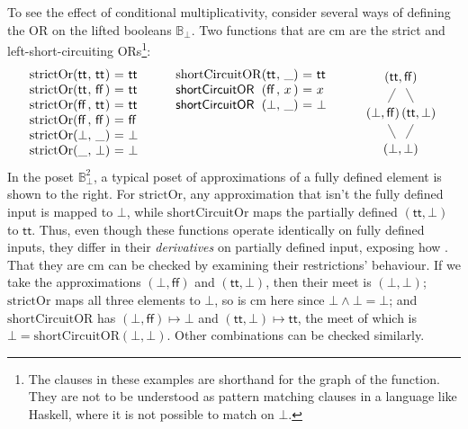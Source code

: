 \begin{example}
  \label{ex:strict-short-circuit}
  To see the effect of conditional multiplicativity, consider several
  ways of defining the OR on the lifted booleans
  $\mathbb{B}_\bot$. Two functions that are cm are the strict and
  left-short-circuiting ORs\footnote{The clauses in these examples are
    shorthand for the graph of the function. They are not to be
    understood as pattern matching clauses in a language like Haskell,
    where it is not possible to match on $\bot$.}:
  \begin{displaymath}
    \begin{array}[t]{l@{(}l@{,~}l@{)~}c@{~}l}
      \mathrm{strictOr}&\mathsf{tt}&\mathsf{tt}&=&\mathsf{tt} \\
      \mathrm{strictOr}&\mathsf{tt}&\mathsf{ff}&=&\mathsf{tt} \\
      \mathrm{strictOr}&\mathsf{ff}&\mathsf{tt}&=&\mathsf{tt} \\
      \mathrm{strictOr}&\mathsf{ff}&\mathsf{ff}&=&\mathsf{ff} \\
      \mathrm{strictOr}&\bot&\_&=&\bot \\
      \mathrm{strictOr}&\_&\bot&=&\bot \\
    \end{array}
    \qquad
    \begin{array}[t]{l@{(}l@{,~}l@{)~}c@{~}l}
      \mathrm{shortCircuitOR}&\mathsf{tt}&\_&=&\mathsf{tt} \\
      \mathsf{shortCircuitOR}&\mathsf{ff}&x&=&x \\
      \mathsf{shortCircuitOR}&\bot&\_& =& \bot
    \end{array}
    \qquad
    \raisebox{-15ex}{
      \begin{tikzpicture}
        \node (top) at (0,0) {$(\mathsf{tt},\mathsf{ff})$};
        \node [below of=top,xshift=-0.5cm] (oi) {$(\bot,\mathsf{ff})$};
        \node [below of=top,xshift=0.5cm] (io) {$(\mathsf{tt},\bot)$};
        \node [below of=oi,xshift=0.5cm] (oo) {$(\bot,\bot)$};
        \draw (top) -- (oi);
        \draw (top) -- (io);
        \draw (oi) -- (oo);
        \draw (io) -- (oo);
      \end{tikzpicture}
    }
  \end{displaymath}
  In the poset $\mathbb{B}_\bot^2$, a typical poset of approximations of a fully defined element is shown to the right. For $\mathrm{strictOr}$, any approximation that isn't the fully defined input is mapped to $\bot$, while $\mathrm{shortCircuitOr}$ maps the partially defined $(\mathsf{tt},\bot)$ to $\mathsf{tt}$. Thus, even though these functions operate identically on fully defined inputs, they differ in their \emph{derivatives} on partially defined input, exposing how . That they are cm can be checked by examining their restrictions' behaviour. If we take the approximations $(\bot,\mathsf{ff})$ and $(\mathsf{tt},\bot)$, then their meet is $(\bot,\bot)$; $\mathrm{strictOr}$ maps all three elements to $\bot$, so is cm here since $\bot \wedge \bot = \bot$; and $\mathrm{shortCircuitOR}$ has $(\bot,\mathsf{ff}) \mapsto \bot$ and $(\mathsf{tt},\bot) \mapsto \mathsf{tt}$, the meet of which is $\bot = \mathrm{shortCircuitOR}(\bot,\bot)$. Other combinations can be checked similarly.

\end{example}
